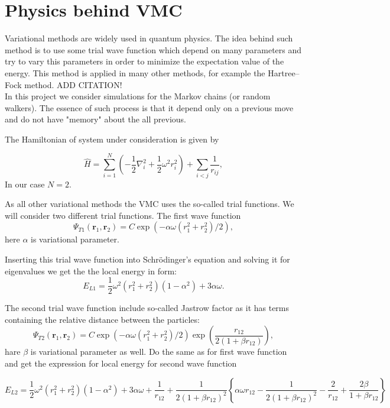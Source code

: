 \documentclass[10pt]{article}
\begin{document}
\newpage
\section{Physics behind  VMC}\label{Part1}
Variational methods are widely used in quantum physics. The idea behind such method is to use some trial wave function which depend on many parameters and try to vary this parameters in order to minimize the expectation value of the energy. This method is applied in many other methods, for example the Hartree–Fock method. ADD CITATION!\\
In this project we consider simulations for the Markov chains (or random walkers). The essence of such process is that it depend only on a previous move and do not have "memory" about the all previous.



The Hamiltonian of system under consideration is given by

\begin{equation}
  \label{eq:finalH}
  \hat{H}=\sum_{i=1}^{N} \left(  -\frac{1}{2} \nabla_i^2 + \frac{1}{2} \omega^2r_i^2  \right)+\sum_{i<j}\frac{1}{r_{ij}},
\end{equation}
In our case $N=2$. 

As all other variational methods the VMC uses the so-called trial functions. We will consider two different trial functions. 
The first wave function
\[
   \Psi_{T1}(\mathbf{r}_1,\mathbf{r}_2) = C\exp{\left(-\alpha\omega(r_1^2+r_2^2)/2\right)},
\]
here  $\alpha$ is variational parameter.

Inserting this trial wave function into Schr\"{o}dinger's equation and solving it for eigenvalues we get the the local energy in form: 
\[ 
E_{L1} = \frac{1}{2}\omega^2\left( r_1^2+r_2^2\right)\left(1-\alpha^2\right) +3\alpha\omega.
\]

The second trial wave function include so-called Jastrow factor as it has terms containing the relative distance between the particles:
\[
    \Psi_{T2}(\mathbf{r}_1,\mathbf{r}_2) =
    C\exp{\left(-\alpha\omega(r_1^2+r_2^2)/2\right)}
    \exp{\left(\frac{r_{12}}{2(1+\beta r_{12})}\right)},
\]
hare $\beta$ is variational parameter as well.
Do the same as for first wave function and get the expression for local energy for second wave function

\[ 
E_{L2} = \frac{1}{2}\omega^2\left( r_1^2+r_2^2\right)\left(1-\alpha^2\right) +3\alpha\omega+\frac{1}{r_{12}}+\frac{1}{2(1+\beta r_{12})^2}\left\{\alpha\omega r_{12}-\frac{1}{2(1+\beta r_{12})^2}-\frac{2}{r_{12}}+\frac{2\beta}{1+\beta r_{12}}\right\}
\]
\end{document}
